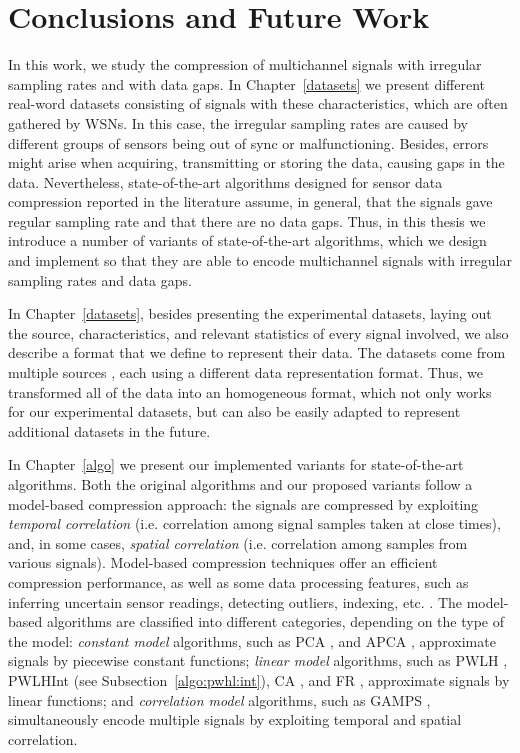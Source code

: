 
\chapter{Conclusions and Future Work} %
\label{conclusions} %



In this work, we study the compression of multichannel signals with irregular sampling rates and with data gaps. In Chapter~\ref{datasets} we present different real-word datasets consisting of signals with these characteristics, which are often gathered by WSNs. In this case, the irregular sampling rates are caused by different groups of sensors being out of sync or malfunctioning. Besides, errors might arise when acquiring, transmitting or storing the data, causing gaps in the data. Nevertheless, state-of-the-art algorithms designed for sensor data compression reported in the literature \cite{AnEva2013, Signal2016} assume, in general, that the signals gave regular sampling rate and that there are no data gaps. Thus, in this thesis we introduce a number of variants of state-of-the-art algorithms, which we design and implement so that they are able to encode multichannel signals with irregular sampling rates and data gaps. 


In Chapter~\ref{datasets}, besides presenting the experimental datasets, laying out the source, characteristics, and relevant statistics of every signal involved, we also describe a format that we define to represent their data. The datasets come from multiple sources \dataCite, each using a different data representation format. Thus, we transformed all of the data into an homogeneous format, which not only works for our experimental datasets, but can also be easily adapted to represent additional datasets in the future.


In Chapter~\ref{algo} we present our implemented variants for state-of-the-art algorithms. Both the original algorithms and our proposed variants follow a model-based compression approach: the signals are compressed by exploiting \textit{temporal correlation} (i.e. correlation among signal samples taken at close times), and, in some cases, \textit{spatial correlation} (i.e. correlation among samples from various signals). Model-based compression techniques offer an efficient compression performance, as well as some data processing features, such as inferring uncertain sensor readings, detecting outliers, indexing, etc. \cite{AnEva2013}. The model-based algorithms are classified into different categories, depending on the type of the model: \textit{constant model} algorithms, such as PCA \cite{coder:pca}, and APCA \cite{coder:apca}, approximate signals by piecewise constant functions; \textit{linear model} algorithms, such as PWLH \cite{coder:pwlh}, PWLHInt (see Subsection~\ref{algo:pwhl:int}), CA \cite{coder:ca}, and FR \cite{coder:fr}, approximate signals by linear functions; and \textit{correlation model} algorithms, such as GAMPS \cite{coder:gamps}, simultaneously encode multiple signals by exploiting temporal and spatial correlation.


